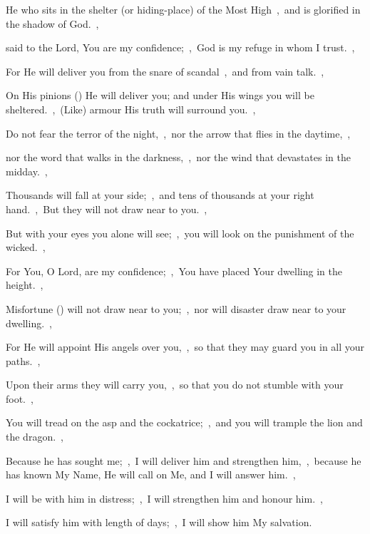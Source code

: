 \documentclass[12pt,twoside,a5paper]{article}
\begin{document}
\begin{halfparskip}
   He who sits in the shelter (or hiding-place) of the Most High~\sep\ and is glorified in the shadow of God.~\sep

  said to the Lord, You are my confidence;~\sep\ God is my refuge in whom I trust.~\sep

  For He will deliver you from the snare of scandal~\sep\ and from vain talk.~\sep

  On His pinions () He will deliver you; and under His wings you will be sheltered.~\sep\ (Like) armour His truth will surround you.~\sep

  Do not fear the terror of the night,~\sep\ nor the arrow that flies in the daytime,~\sep

  nor the word that walks in the darkness,~\sep\ nor the wind that devastates in the midday.~\sep

  Thousands will fall at your side;~\sep\ and tens of thousands at your right hand.~\sep\ But they will not draw near to you.~\sep

  But with your eyes you alone will see;~\sep\ you will look on the punishment of the wicked.~\sep

  For You, O Lord, are my confidence;~\sep\ You have placed Your dwelling in the height.~\sep

  Misfortune () will not draw near to you;~\sep\ nor will disaster draw near to your dwelling.~\sep

  For He will appoint His angels over you,~\sep\ so that they may guard you in all your paths.~\sep

  Upon their arms they will carry you,~\sep\ so that you do not stumble with your foot.~\sep

  You will tread on the asp and the cockatrice;~\sep\ and you will trample the lion and the dragon.~\sep

  Because he has sought me;~\sep\ I will deliver him and strengthen him,~\sep\ because he has known My Name, He will call on Me, and I will answer him.~\sep

  I will be with him in distress;~\sep\ I will strengthen him and honour him.~\sep

  I will satisfy him with length of days;~\sep\ I will show him My salvation.
\end{halfparskip}
\end{document}
